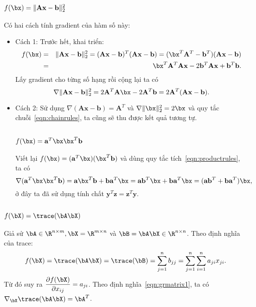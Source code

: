 \subsection{$f(\bx) = \|\mathbf{Ax} - \mathbf{b}\|_2^2 $}
\label{sec:gr_squarenorm2}
Có hai cách tính gradient của hàm số này:
\begin{itemize}
    \item {Cách 1:} Trước hết, khai triển:
\begin{eqnarray}
    \nonumber
    f(\bx) &=& \|\mathbf{Ax} - \mathbf{b}\|_2^2 = (\mathbf{Ax} - \mathbf{b})^T(\mathbf{Ax} - \mathbf{b}) = (\bx^T\mathbf{A}^T - \mathbf{b}^T) (\mathbf{Ax} - \mathbf{b}) \\\ \nonumber
    &=& \bx^T\mathbf{A}^T\mathbf{Ax} - 2 \mathbf{b}^T\mathbf{Ax} + \mathbf{b}^T\mathbf{b}.
\end{eqnarray}
Lấy gradient cho từng số hạng rồi cộng lại ta có
\begin{equation*}
\nabla \|\mathbf{Ax} - \mathbf{b}\|_2^2 = 2\mathbf{A}^T\mathbf{A}\bx - 2\mathbf{A}^T\mathbf{b} = 2\mathbf{A}^T(\mathbf{Ax} - \mathbf{b}).
\end{equation*}

\item {Cách 2:} Sử dụng $\nabla (\mathbf{Ax} - \mathbf{b}) =
\mathbf{A}^T$ và $\nabla \|\bx\|_2^2 = 2\bx$ và quy tắc chuỗi~\eqref{eqn:chainrules}, ta cũng sẽ thu được kết quả tương tự.


\subsection{$f(\bx) = \mathbf{a}^T\bx\bx^T\mathbf{b}$}
Viết lại $f(\bx) = (\mathbf{a}^T\bx)(\bx^T\mathbf{b})$ và dùng
quy tắc tích~\eqref{eqn:productrules}, ta có
\begin{equation*}
    \nabla (\mathbf{a}^T\bx\bx^T\mathbf{b}) = \mathbf{a} \bx^T\mathbf{b} +
    \mathbf{b}\mathbf{a}^T\bx = \mathbf{ab}^T\bx + \mathbf{b}\mathbf{a}^T\bx=
    (\mathbf{ab}^T + \mathbf{ba}^T)\bx,
\end{equation*}
ở đây ta đã sử dụng tính chất $\mathbf{y}^T\mathbf{z} = \mathbf{z}^T\mathbf{y}$.
\end{itemize}

\subsection{$f(\bX) = \trace(\bA\bX)$}
Giả sử $\bA \in \R^{n\times m}, \bX = \R^{m\times n}$ và $\bB = \bA\bX \in \R^
{n \times n}$. Theo định nghĩa của trace:
\begin{equation}
    f(\bX) = \trace(\bA\bX) = \trace(\bB) = \sum_{j = 1}^n {b_{jj}} =
    \sum_{j=1}^n\sum_{i=1}^n a_{ji}x_{ji}.
\end{equation}
Từ đó suy ra $\displaystyle\frac{\partial f(\bX)}{\partial x_{ij}} =
a_{ji}$. Theo định nghĩa~\eqref{eqn:grmatrix1}, ta có $\nabla_{\bX}\trace(\bA\bX) =
\bA^T$.

